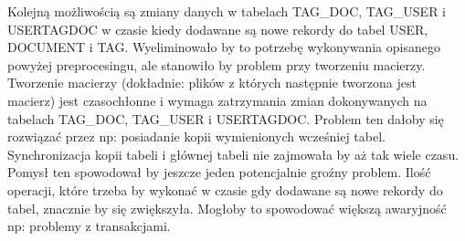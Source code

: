 Kolejną możliwością są zmiany danych w tabelach TAG\_DOC, TAG\_USER i USERTAGDOC w czasie kiedy dodawane są nowe rekordy do tabel USER, DOCUMENT i TAG. Wyeliminowało by to potrzebę wykonywania opisanego powyżej preprocesingu, ale stanowiło by problem przy tworzeniu macierzy. Tworzenie macierzy (dokładnie: plików z których następnie tworzona jest macierz) jest czasochłonne i wymaga zatrzymania zmian dokonywanych na tabelach TAG\_DOC, TAG\_USER i USERTAGDOC. Problem ten dałoby się rozwiązać przez np: posiadanie kopii wymienionych wcześniej tabel. Synchronizacja kopii tabeli i głównej tabeli nie zajmowała by aż tak wiele czasu. Pomysł ten spowodował by jeszcze jeden potencjalnie groźny problem. Ilość operacji, które trzeba by wykonać w czasie gdy dodawane są nowe rekordy do tabel, znacznie by się zwiększyła. Mogłoby to spowodować większą awaryjność np: problemy z transakcjami.











